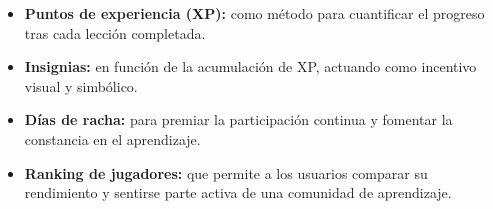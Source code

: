 \begin{itemize}
\item \textbf{Puntos de experiencia (XP): } como método para cuantificar el progreso tras cada lección completada.
\item \textbf{Insignias: } en función de la acumulación de XP, actuando como incentivo visual y simbólico.
\item \textbf{Días de racha: } para premiar la participación continua y fomentar la constancia en el aprendizaje.
\item \textbf{Ranking de jugadores: } que permite a los usuarios comparar su rendimiento y sentirse parte activa de una comunidad de aprendizaje.
\end{itemize}


